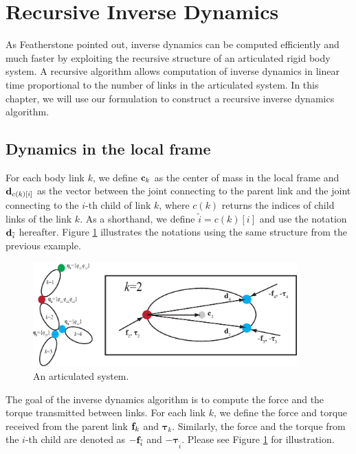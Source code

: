 \section{Recursive Inverse Dynamics}
\label{sec:invdyn}
As Featherstone pointed out, inverse dynamics can be computed
efficiently and much faster by exploiting the recursive structure of an articulated
rigid body system. A recursive algorithm allows computation of inverse dynamics
in linear time proportional to the number of links in the articulated system. In
this chapter, we will use our formulation to construct a recursive
inverse dynamics algorithm.

\subsection{Dynamics in the local frame}
For each body link $k$, we define $\mathbf{c}_k$ as the center of mass in
the local frame and $\mathbf{d}_{c(k)[i]}$ as the vector between the joint
connecting to the parent link and the joint connecting to the $i$-th child of
link $k$, where $c(k)$ returns the indices of child links of the link
$k$. As a shorthand, we define $\tilde{i} = c(k)[i]$ and use the
notation $\mathbf{d}_{\tilde{i}}$ hereafter.  Figure \ref{fig:example2}
illustrates the notations using the same structure from the previous
example.

\begin{figure}
 \vspace{20pt}
\begin{center}
\includegraphics[width=4in]{example2.eps}
\end{center}
\caption{An articulated system.}
 \vspace{0pt}
\label{fig:example2}
\end{figure}

The goal of the inverse dynamics algorithm is to compute the force and
the torque transmitted between links. For each link $k$, we define the
force and torque received from the parent link $\mathbf{f}_k$ and
$\bm{\tau}_k$. Similarly, the force and the torque from the $i$-th
child are denoted as $-\mathbf{f}_{\tilde{i}}$ and
$-\bm{\tau}_{\tilde{i}}$. Please see Figure \ref{fig:example2} for illustration.

